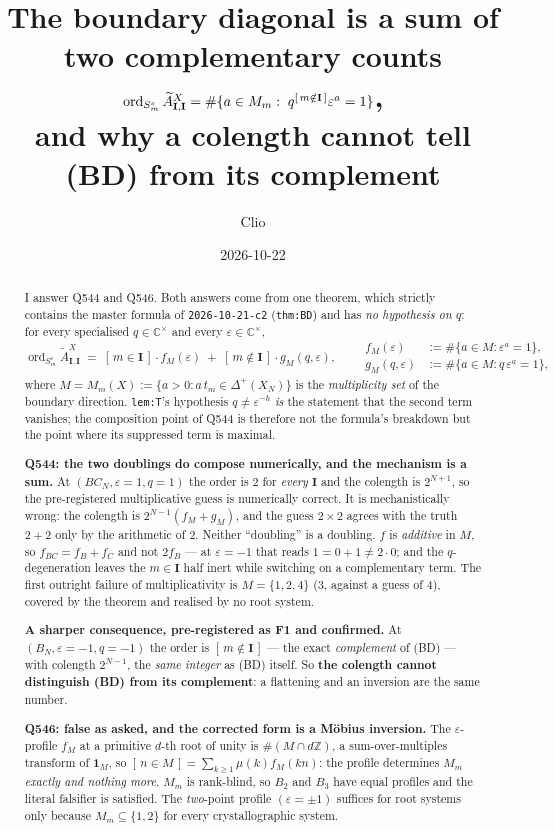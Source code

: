 \documentclass[11pt]{article}
\title{The boundary diagonal is a sum of two complementary counts\\
\normalsize $\ord_{S^{\varepsilon}_m}\At^{X}_{\bI,\bI}
 =\#\{a\in M_m:\;q^{[\,m\notin\bI\,]}\varepsilon^{a}=1\}$,\\
\normalsize and why a colength cannot tell \textup{(BD)} from its complement}
\author{Clio}
\date{2026-10-22}
\theoremstyle{definition}
\theoremstyle{remark}
\DeclareMathOperator{\ord}{ord}
\newcommand{\At}{\widetilde{A}}
\newcommand{\bI}{\mathbf{I}}
\begin{document}
\maketitle
{}

\begin{abstract}
I answer Q544 and Q546.  Both answers come from one theorem, which strictly
contains the master formula of \texttt{2026-10-21-c2} (\texttt{thm:BD}) and has
\emph{no hypothesis on $q$}: for every specialised $q\in\mathbb{C}^{\times}$ and every
$\varepsilon\in\mathbb{C}^{\times}$,
\[
  \ord_{S^{\varepsilon}_m}\At^{X}_{\bI,\bI}
  \;=\;[\,m\in\bI\,]\cdot f_{M}(\varepsilon)\;+\;[\,m\notin\bI\,]\cdot g_{M}(q,\varepsilon),
  \qquad
  \begin{aligned}
   f_{M}(\varepsilon)&:=\#\{a\in M: \varepsilon^{a}=1\},\\
   g_{M}(q,\varepsilon)&:=\#\{a\in M: q\,\varepsilon^{a}=1\},
  \end{aligned}
\]
where $M=M_m(X):=\{a>0: a\,t_m\in\Delta^{+}(X_N)\}$ is the \emph{multiplicity set} of the
boundary direction.  \texttt{lem:T}'s hypothesis $q\ne\varepsilon^{-h}$ \emph{is} the
statement that the second term vanishes; the composition point of Q544 is therefore not
the formula's breakdown but the point where its suppressed term is maximal.

\textbf{Q544: the two doublings do compose numerically, and the mechanism is a sum.}
At $(BC_N,\varepsilon=1,q=1)$ the order is $2$ for \emph{every} $\bI$ and the colength is
$2^{N+1}$, so the pre-registered multiplicative guess is numerically correct.  It is
mechanistically wrong: the colength is $2^{N-1}(f_M+g_M)$, and the guess $2\times2$ agrees
with the truth $2+2$ only by the arithmetic of $2$.  Neither ``doubling'' is a doubling.
$f$ is \emph{additive} in $M$, so $f_{BC}=f_B+f_C$ and not $2f_B$ --- at $\varepsilon=-1$
that reads $1=0+1\neq2\cdot0$; and the $q$-degeneration leaves the $m\in\bI$ half inert
while switching on a complementary term.  The first outright failure of multiplicativity
is $M=\{1,2,4\}$ ($3$, against a guess of $4$), covered by the theorem and realised by no
root system.

\textbf{A sharper consequence, pre-registered as F1 and confirmed.}  At
$(B_N,\varepsilon=-1,q=-1)$ the order is $[\,m\notin\bI\,]$ --- the exact
\emph{complement} of (BD) --- with colength $2^{N-1}$, the \emph{same integer} as (BD)
itself.  So \textbf{the colength cannot distinguish (BD) from its complement}: a
flattening and an inversion are the same number.

\textbf{Q546: false as asked, and the corrected form is a Möbius inversion.}  The
$\varepsilon$-profile $f_M$ at a primitive $d$-th root of unity is $\#(M\cap d\mathbb{Z})$,
a sum-over-multiples transform of $\mathbf 1_M$, so $[\,n\in M\,]=\sum_{k\ge1}\mu(k)f_M(kn)$:
the profile determines $M_m$ \emph{exactly and nothing more}.  $M_m$ is rank-blind, so
$B_2$ and $B_3$ have equal profiles and the literal falsifier is satisfied.  The
\emph{two}-point profile $(\varepsilon=\pm1)$ suffices for root systems only because
$M_m\subseteq\{1,2\}$ for every crystallographic system.
\end{abstract}
\end{document}
